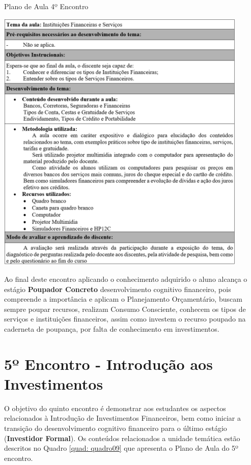 \newpage
\graphicspath{{quadros/}} 
\begin{quadro}[!ht]
\centering
\begin{minipage}{1.\textwidth}
\caption{Plano de Aula 4º Encontro}
\centering
\includegraphics[width=0.9\textwidth]{quadro-8_plano-aula-4}
\label{quad: quadro08}
\end{minipage}
\end{quadro}

Ao final deste encontro aplicando o conhecimento adquirido o aluno alcança o estágio \textbf{Poupador Concreto} desenvolvimento cognitivo financeiro, pois compreende a importância e aplicam o Planejamento Orçamentário, buscam sempre poupar recursos, realizam Consumo Consciente, conhecem os tipos de serviços e instituições financeiros, assim como investem o recurso poupado na caderneta de poupança, por falta de conhecimento em investimentos.

\section{5º Encontro - Introdução aos Investimentos}
O objetivo do quinto encontro é demonstrar aos estudantes os aspectos relacionados à Introdução de Investimentos Financeiros, bem como iniciar a transição do desenvolvimento cognitivo financeiro para o último estágio (\textbf{Investidor Formal}). Os conteúdos relacionados a unidade temática estão descritos no Quadro \ref{quad: quadro09} que apresenta o Plano de Aula do 5º encontro.

